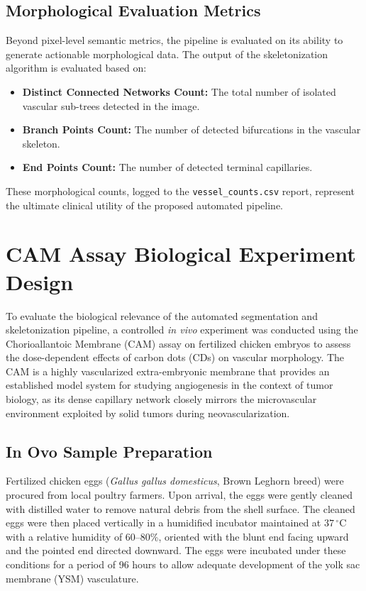\subsection{Morphological Evaluation Metrics}
Beyond pixel-level semantic metrics, the pipeline is evaluated on its ability to generate actionable morphological data. The output of the skeletonization algorithm is evaluated based on:
\begin{itemize}
    \item \textbf{Distinct Connected Networks Count:} The total number of isolated vascular sub-trees detected in the image.
    \item \textbf{Branch Points Count:} The number of detected bifurcations in the vascular skeleton.
    \item \textbf{End Points Count:} The number of detected terminal capillaries.
\end{itemize}
These morphological counts, logged to the \texttt{vessel\_counts.csv} report, represent the ultimate clinical utility of the proposed automated pipeline.

\section{CAM Assay Biological Experiment Design}
To evaluate the biological relevance of the automated segmentation and skeletonization pipeline, a controlled \textit{in vivo} experiment was conducted using the Chorioallantoic Membrane (CAM) assay on fertilized chicken embryos to assess the dose-dependent effects of carbon dots (CDs) on vascular morphology. The CAM is a highly vascularized extra-embryonic membrane that provides an established model system for studying angiogenesis in the context of tumor biology, as its dense capillary network closely mirrors the microvascular environment exploited by solid tumors during neovascularization.

\subsection{In Ovo Sample Preparation}
Fertilized chicken eggs (\textit{Gallus gallus domesticus}, Brown Leghorn breed) were procured from local poultry farmers. Upon arrival, the eggs were gently cleaned with distilled water to remove natural debris from the shell surface. The cleaned eggs were then placed vertically in a humidified incubator maintained at $37\,^{\circ}\text{C}$ with a relative humidity of 60--80\%, oriented with the blunt end facing upward and the pointed end directed downward. The eggs were incubated under these conditions for a period of 96 hours to allow adequate development of the yolk sac membrane (YSM) vasculature.

